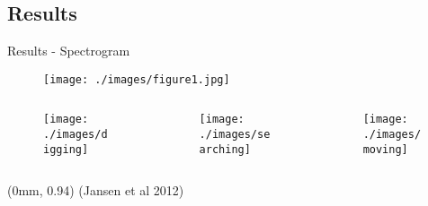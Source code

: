 \documentclass[xcolor=dvipsnames]{beamer}
\newcommand\References[1]{
\tiny{
  \begin{textblock*}{\paperwidth}(0mm, 0.94\paperheight)%
    \raggedleft (#1)\hspace{0.01\paperwidth}
  \end{textblock*}}}
\begin{document}
\subsection{Results}
\begin{frame}{Results - Spectrogram}
\begin{overlayarea}{\textwidth}{0.5\paperheight}
\begin{figure}[h]
\texttt{[image: ./images/figure1.jpg]}
\end{figure}
\end{overlayarea}
\begin{overlayarea}{\textwidth}{0.4\paperheight}
\begin{columns}
\begin{column}{0.33\textwidth}
\begin{center}
\begin{figure}
\centering
\texttt{[image: ./images/digging]}
\end{figure}
\end{center}
\end{column}

\begin{column}{0.33\textwidth}
\begin{center}
\begin{figure}
\centering
\texttt{[image: ./images/searching]}
\end{figure}
\end{center}
\end{column}


\begin{column}{0.33\textwidth}
\begin{center}
\begin{figure}
\centering
\texttt{[image: ./images/moving]}
\end{figure}
\end{center}
\end{column}
\end{columns}
\end{overlayarea}
\References{Jansen et al 2012}
\end{frame}
\end{document}
